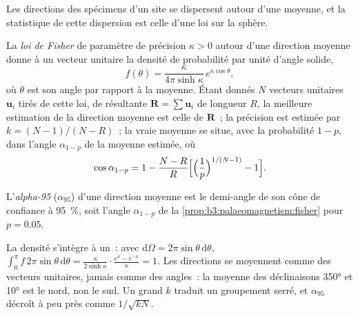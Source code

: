 \begin{omfigure}
\par{}\label{fig:b3:palaeomagnetism:zijderveld}
\end{omfigure}

Les directions des spécimens d'un site se dispersent autour d'une moyenne, et la
statistique de cette dispersion est celle d'une loi sur la sphère.

\begin{proposition}\label{prop:b3:palaeomagnetism:fisher}
La \emph{loi de Fisher} de paramètre de précision
$\kappa > 0$ autour d'une direction moyenne donne à un vecteur unitaire la
densité de probabilité par unité d'angle solide,
\[
  f(\theta) = \frac{\kappa}{4\pi\sinh\kappa}\,e^{\kappa\cos\theta},
\]
où $\theta$ est son angle par rapport à la moyenne. Étant donnés $N$ vecteurs unitaires $\mathbf u_i$
tirés de cette loi, de résultante $\mathbf R = \sum\mathbf u_i$ de longueur $R$, la
meilleure estimation de la direction moyenne est celle de $\mathbf R$~; la précision est
estimée par $k = (N - 1)/(N - R)$~; la vraie moyenne se situe, avec la probabilité
$1 - p$, dans l'angle $\alpha_{1-p}$ de la moyenne estimée, où
\[
  \cos\alpha_{1-p} = 1 - \frac{N - R}{R}\Bigl[\Bigl(\frac1p\Bigr)^{1/(N-1)} - 1\Bigr].
\]
\end{proposition}
\admitted

\begin{definition}[Alpha-95]\label{def:b3:palaeomagnetism:a95}
L'\emph{alpha-95} ($\alpha_{95}$) d'une direction moyenne est le
demi-angle de son cône de confiance à 95~\%, soit l'angle $\alpha_{1-p}$ de
la \cref{prop:b3:palaeomagnetism:fisher} pour $p = 0.05$.
\end{definition}

La densité s'intègre à un~: avec $\mathrm d\Omega = 2\pi\sin\theta\,\mathrm
d\theta$, $\int_0^\pi f\,2\pi\sin\theta\,\mathrm d\theta =
\frac{\kappa}{2\sinh\kappa}\cdot\frac{e^\kappa - e^{-\kappa}}{\kappa} = 1$. Les directions se moyennent comme
des vecteurs unitaires, jamais comme des angles~: la moyenne des déclinaisons \ang{350} et \ang{10} est
le nord, non le sud. Un grand $k$ traduit un groupement serré, et $\alpha_{95}$ décroît
à peu près comme $1/\sqrt{kN}$.

